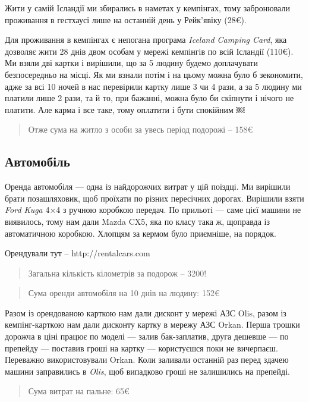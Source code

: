 Жити у самій Ісландії ми збирались в наметах у кемпінгах, тому
забронювали проживання в гестхаусі лише на останній день у Рейк'явіку
(28\euro{}).

Для проживання в кемпінгах є непогана програма \emph{Iceland Camping
Card}, яка дозволяє жити 28 днів двом особам у мережі кемпінгів по всій
Ісландії (110\euro{}). Ми взяли дві картки і вирішили, що за 5 людину
будемо доплачувати безпосередньо на місці. Як ми взнали потім і на цьому
можна було б зекономити, адже за всі 10 ночей в нас перевірили картку
лише 3 чи 4 рази, а за 5 людину ми платили лише 2 рази, та й то, при
бажанні, можна було би скіпнути і нічого не платити. Але карма і все
таке, тому оплатити і бути спокійним ￼

\begin{quote}
Отже сума на житло з особи за увесь період подорожі -- 158\euro{}
\end{quote}

\subsection{Автомобіль}

Оренда автомобіля --- одна із найдорожчих витрат у цій поїздці. Ми
вирішили брати позашляховик, щоб проїхати по різних пересічних дорогах.
Вирішили взяти \emph{Ford Kuga} 4×4 з ручною коробкою передач. По
прильоті --- саме цієї машини не виявилось, тому нам дали Mazda CX5, яка
по класу така ж, щоправда із автоматичною коробкою. Хлопцям за кермом
було приємніше, на порядок.

Орендували тут -- http://rentalcars.com

\begin{quote}
Загальна кількість кілометрів за подорож -- 3200!
\end{quote}

\begin{quote}
Сума оренди автомобіля на 10 днів на людину: 152\euro{}
\end{quote}

Разом із орендованою карткою нам дали дисконт у мережі АЗС Olis, разом
із кемпінг-карткою нам дали дисконту картку в мережу АЗС Orkan. Перша
трошки дорожча в ціні працює по моделі --- залив бак-заплатив, друга
дешевше --- по препейду --- поставив гроші на картку --- користуєшся
поки не вичерпаєш. Переважно використовували Orkan. Коли заливали
останній раз перед здачею машини заправились в \emph{Olis}, щоб
випадково гроші не залишились на препейді.

\begin{quote}
Сума витрат на пальне: 65\euro{}
\end{quote}

